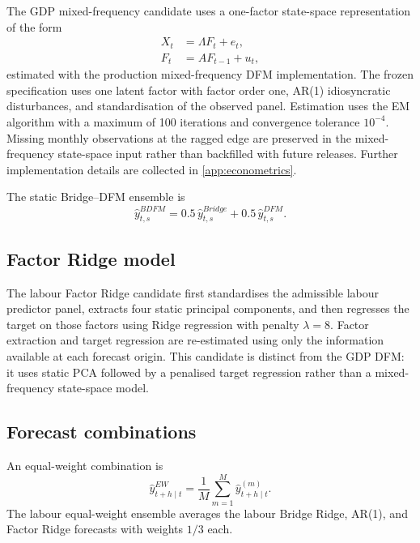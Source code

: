 The GDP mixed-frequency candidate uses a one-factor state-space representation
of the form
\begin{align}
    X_t &= \Lambda F_t + e_t, \\
    F_t &= A F_{t-1}+u_t,
    \label{eq:dfm}
\end{align}
estimated with the production mixed-frequency DFM implementation. The frozen
specification uses one latent factor with factor order one, AR(1)
idiosyncratic disturbances, and standardisation of the observed panel.
Estimation uses the EM algorithm with a maximum of 100 iterations and
convergence tolerance \(10^{-4}\). Missing monthly observations at the ragged
edge are preserved in the mixed-frequency state-space input rather than
backfilled with future releases. Further implementation details are collected
in \ref{app:econometrics}.

The static Bridge--DFM ensemble is
\[
    \widehat y^{BDFM}_{t,s}
    =
    0.5\,\widehat y^{Bridge}_{t,s}
    +
    0.5\,\widehat y^{DFM}_{t,s}.
\]

\subsection{Factor Ridge model}
\label{subsec:factor_ridge}

The labour Factor Ridge candidate first standardises the admissible labour
predictor panel, extracts four static principal components, and then regresses
the target on those factors using Ridge regression with penalty
\(\lambda=8\). Factor extraction and target regression are re-estimated using
only the information available at each forecast origin. This candidate is
distinct from the GDP DFM: it uses static PCA followed by a penalised target
regression rather than a mixed-frequency state-space model.

\subsection{Forecast combinations}
\label{subsec:combinations}

An equal-weight combination is
\begin{equation}
    \widehat{y}_{t+h\mid t}^{EW}
    =
    \frac{1}{M}\sum_{m=1}^{M}
    \widehat{y}_{t+h\mid t}^{(m)}.
    \label{eq:equal_weight}
\end{equation}
The labour equal-weight ensemble averages the labour Bridge Ridge, AR(1), and
Factor Ridge forecasts with weights \(1/3\) each.

